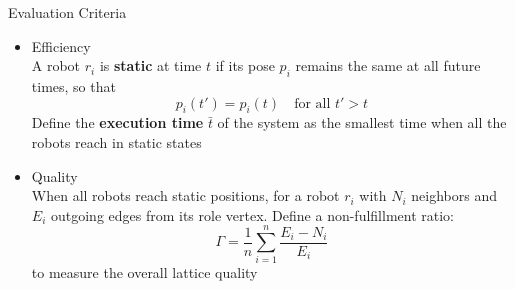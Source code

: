 \documentclass[10pt]{beamer}
\begin{document}
\begin{frame}{Evaluation Criteria}
  \begin{itemize}
  \item Efficiency\\
    A robot $r_i$ is \textbf{static} at time $t$ if its pose $p_i$
    remains the same at all future times, so that 
    $$p_i(t') = p_i(t) \quad \mbox {for all } t' > t$$    
  Define the \textbf{execution time} $\bar{t}$ of the system as the smallest time
  when all the robots reach in static states
  \item Quality \\
    When all robots reach static positions, for a robot $r_i$
    with $N_i$ neighbors and $E_i$ outgoing edges from its role vertex. 
    Define a non-fulfillment ratio:
    $$\Gamma = \dfrac{1}{n}\sum\limits_{i=1}^n \frac{E_i - N_i}{E_i}$$
    to measure the overall lattice quality
  \end{itemize}
  
\end{frame}
\end{document}
